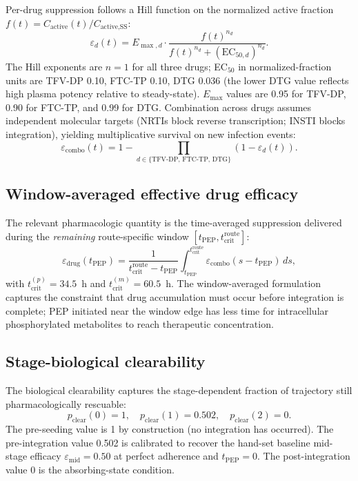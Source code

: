 \documentclass[11pt]{article}
\theoremstyle{definition}
\theoremstyle{remark}
\newcommand{\tcrit}{t_{\text{crit}}}
\newcommand{\emid}{\varepsilon_{\text{mid}}}
\begin{document}
Per-drug suppression follows a Hill function on the normalized active fraction $f(t) = C_{\text{active}}(t) / C_{\text{active,SS}}$:
\[
\varepsilon_d(t) = E_{\max,d} \cdot \frac{f(t)^{n_d}}{f(t)^{n_d} + (\text{EC}_{50,d})^{n_d}}.
\]
The Hill exponents are $n = 1$ for all three drugs; EC$_{50}$ in normalized-fraction units are TFV-DP 0.10, FTC-TP 0.10, DTG 0.036 (the lower DTG value reflects high plasma potency relative to steady-state). $E_{\max}$ values are 0.95 for TFV-DP, 0.90 for FTC-TP, and 0.99 for DTG. Combination across drugs assumes independent molecular targets (NRTIs block reverse transcription; INSTI blocks integration), yielding multiplicative survival on new infection events:
\[
\varepsilon_{\text{combo}}(t) = 1 - \prod_{d \in \{\text{TFV-DP, FTC-TP, DTG}\}} \left(1 - \varepsilon_d(t)\right).
\]

\subsection{Window-averaged effective drug efficacy}

The relevant pharmacologic quantity is the time-averaged suppression delivered during the \emph{remaining} route-specific window $[t_{\text{PEP}}, \tcrit^{\text{route}}]$:
\[
\varepsilon_{\text{drug}}(t_{\text{PEP}}) = \frac{1}{\tcrit^{\text{route}} - t_{\text{PEP}}} \int_{t_{\text{PEP}}}^{\tcrit^{\text{route}}} \varepsilon_{\text{combo}}(s - t_{\text{PEP}}) \, ds,
\]
with $\tcrit^{(p)} = 34.5$~h and $\tcrit^{(m)} = 60.5$~h. The window-averaged formulation captures the constraint that drug accumulation must occur before integration is complete; PEP initiated near the window edge has less time for intracellular phosphorylated metabolites to reach therapeutic concentration.

\subsection{Stage-biological clearability}

The biological clearability captures the stage-dependent fraction of trajectory still pharmacologically rescuable:
\[
p_{\text{clear}}(0) = 1, \quad p_{\text{clear}}(1) = 0.502, \quad p_{\text{clear}}(2) = 0.
\]
The pre-seeding value is 1 by construction (no integration has occurred). The pre-integration value 0.502 is calibrated to recover the hand-set baseline mid-stage efficacy $\emid = 0.50$ at perfect adherence and $t_{\text{PEP}} = 0$. The post-integration value 0 is the absorbing-state condition.
\end{document}

